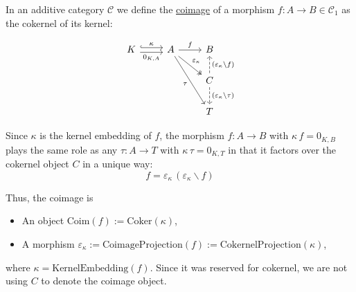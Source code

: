\begin{definition}[Coimage]
In an additive category $\mathcal{C}$ we define the \ul{coimage} of a morphism $f : A \rightarrow B \in \mathcal{C}_{1}$ as the 
cokernel of its kernel:\\
\begin{minipage}{.06\textwidth} \phantom{} \end{minipage}
\begin{minipage}{.39\textwidth}
\[
\begin{tikzcd}[
  ampersand replacement=\&,
]
K \arrow[r, "\kappa", hook, shift left] \arrow[r, "{0_{K,A}}"', shift right] \& A \arrow[r, "f"] \arrow[rd, "{\varepsilon_{\kappa}}", two heads] \arrow[rdd, "\tau"'] \& B                                                                                                   \\
                                                                             \&                                                                            \& C \arrow[u, "({\varepsilon_{\kappa}}\backslash f)"', dashed] \arrow[d, "({\varepsilon_{\kappa}}\backslash \tau)", dashed] \\
                                                                             \&                                                                            \& T                                                                                                  
\end{tikzcd}
\]
\end{minipage}
\begin{minipage}{.49\textwidth}
Since $\kappa$ is the kernel embedding of $f$, the morphism $f : A \rightarrow B$ with $\kappa\,f = 0_{K,B}$ plays the
same role as any $\tau : A \rightarrow T$ with $\kappa\,\tau = 0_{K,T}$ in that it factors over the cokernel object $C$ in a
unique way:
\[
f = \varepsilon_{\kappa}\,(\varepsilon_{\kappa}\backslash f)
\]
\end{minipage}
\begin{minipage}{.06\textwidth} \phantom{} \end{minipage}

Thus, the coimage is
\begin{itemize}
\item An object $\mathrm{Coim}(f) := \mathrm{Coker}(\kappa)$,
\item A morphism $\varepsilon_{\kappa} := \mathrm{CoimageProjection}(f) := \mathrm{CokernelProjection}(\kappa)$,
\end{itemize}
where $\kappa = \mathrm{KernelEmbedding}(f)$.
Since it was reserved for cokernel, we are not using $C$ to denote the coimage object.
\end{definition}

